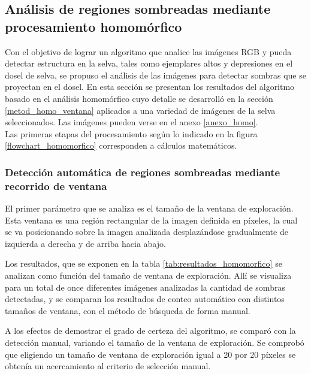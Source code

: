 \subsection{Análisis de regiones sombreadas mediante procesamiento homomórfico} \label{resultados homo}
Con el objetivo de lograr un algoritmo que analice las imágenes RGB y pueda detectar estructura en la selva, tales como ejemplares altos y depresiones en el dosel de selva, se propuso el análisis de las imágenes para detectar sombras que se proyectan en el dosel. En esta sección se presentan los resultados del algoritmo basado en el análisis homomórfico cuyo detalle se desarrolló en la sección \ref{metod_homo_ventana} aplicados a una variedad de imágenes de la selva seleccionados. Las imágenes pueden verse en el anexo \ref{anexo_homo}.\\

Las primeras etapas del procesamiento según lo indicado en la figura \ref{flowchart_homomorfico} corresponden a cálculos matemáticos.
\subsubsection{Detección automática de regiones sombreadas mediante recorrido de ventana} \label{resultados homo ventana}
El primer parámetro que se analiza es el tamaño de la ventana de exploración. Esta ventana es una región rectangular de la imagen definida en píxeles, la cual se va posicionando sobre la imagen analizada desplazándose gradualmente de izquierda a derecha y de arriba hacia abajo.

 Los resultados, que se exponen en la tabla \ref{tab:resultados_homomorfico} se analizan como función del tamaño de ventana de exploración.
Allí se visualiza para un total de once diferentes imágenes analizadas la cantidad de sombras detectadas, y se comparan los resultados de conteo automático con distintos tamaños de ventana, con el método de búsqueda de forma manual.

A los efectos de demostrar el grado de certeza del algoritmo, se comparó con la detección manual, variando el tamaño de la ventana de exploración. Se comprobó que eligiendo un tamaño de ventana de exploración igual a 20 por 20 píxeles se obtenía un acercamiento al criterio de selección manual.

